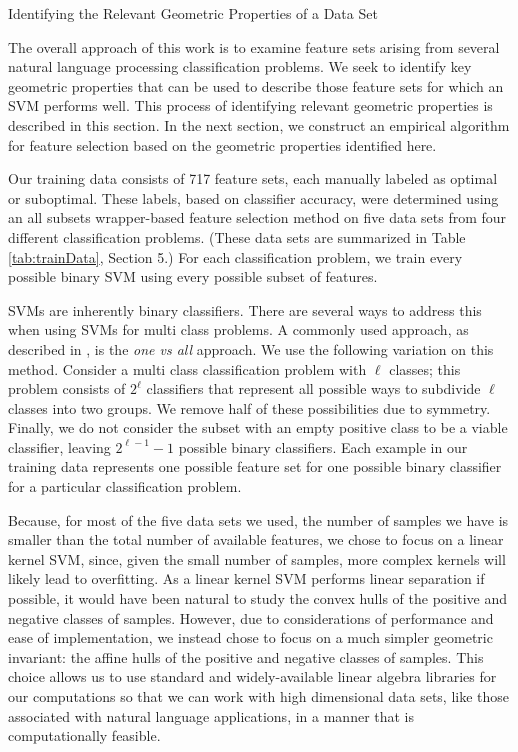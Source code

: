 \documentclass{llncs}
\begin{document}
\begin{section}{Identifying the Relevant Geometric Properties of a Data Set}

The overall approach of this work is to examine feature sets arising from  several natural language processing classification problems. We seek to identify key geometric properties that can be used to describe those feature sets for which an SVM performs well. This process of identifying relevant geometric properties is described in this section. In the next section, we construct an empirical algorithm for feature selection based on the geometric properties identified here.

Our training data consists of 717 feature sets, each manually labeled as optimal or suboptimal. These labels, based on classifier accuracy, were determined using an all subsets wrapper-based feature selection method on five data sets from four different classification problems. (These data sets are summarized in Table \ref{tab:trainData}, Section 5.) For each classification problem, we train every possible binary SVM using every possible subset of features. 


SVMs are inherently binary classifiers. There are several ways to address this when using SVMs for  multi class problems. A commonly used approach, as described in \cite{HanKamber}, is the {\em one vs all} approach. We use the following variation on this method. Consider a multi class classification problem with $\ell$ classes; this problem consists of $2^{\ell}$ classifiers that represent all possible ways to subdivide $\ell$ classes into two groups. We remove half of these possibilities due to symmetry. Finally, we do not consider the subset with an empty positive class to be a viable classifier, leaving $2^{\ell -1}-1$ possible binary classifiers. Each example in our training data represents one possible feature set for one possible binary classifier for a particular classification problem.

Because, for most of the five data sets we used, the number of samples we have is smaller than the total number of available features, we chose to focus on a linear kernel SVM, since, given the small number of samples, more complex kernels will likely lead to overfitting. As a linear kernel SVM performs linear separation if possible, it would have been natural to study the convex hulls of the positive and negative classes of samples. However, due to considerations of performance and ease of implementation, we instead chose to focus on a much simpler geometric invariant: the affine hulls of the positive and negative classes of samples. This choice allows us to use standard and widely-available linear algebra libraries for our computations so that we can work with high dimensional data sets, like those associated with natural language applications, in a manner that is computationally feasible.


\end{section}
\end{document}
